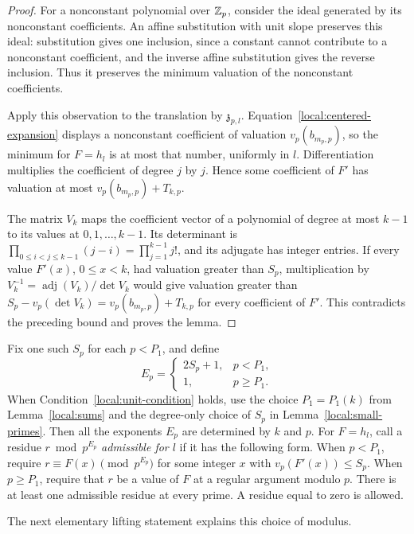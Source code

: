 \begin{proof}
For a nonconstant polynomial over \(\mathbb Z_p\), consider the ideal generated
by its nonconstant coefficients. An affine substitution with unit slope
preserves this ideal: substitution gives one inclusion, since a constant
cannot contribute to a nonconstant coefficient, and the inverse affine
substitution gives the reverse inclusion. Thus it preserves the minimum
valuation of the nonconstant coefficients.

Apply this observation to the translation by \(\mathfrak z_{p,l}\).
Equation~\eqref{local:centered-expansion} displays a nonconstant coefficient
of valuation \(v_p(b_{m_p,p})\), so the minimum for \(F=h_l\) is at most
that number, uniformly in \(l\). Differentiation multiplies the coefficient
of degree \(j\) by \(j\). Hence some coefficient of \(F'\) has valuation at
most \(v_p(b_{m_p,p})+T_{k,p}\).

The matrix \(V_k\) maps the coefficient vector of a polynomial of degree at
most \(k-1\) to its values at \(0,1,\ldots,k-1\). Its determinant is
\(\prod_{0\le i<j\le k-1}(j-i)=\prod_{j=1}^{k-1}j!\), and its adjugate has
integer entries. If every value \(F'(x)\), \(0\le x<k\), had valuation
greater than \(S_p\), multiplication by \(V_k^{-1}=\operatorname{adj}(V_k)/
\det V_k\) would give valuation greater than
\(S_p-v_p(\det V_k)=v_p(b_{m_p,p})+T_{k,p}\) for every coefficient of
\(F'\). This contradicts the preceding bound and proves the lemma.
\end{proof}

Fix one such \(S_p\) for each \(p<P_1\), and define
\[
 E_p=
 \begin{cases}
  2S_p+1,&p<P_1,\\
  1,&p\ge P_1.
 \end{cases}
\]
When Condition~\eqref{local:unit-condition} holds, use the choice
\(P_1=P_1(k)\) from Lemma~\ref{local:sums} and the degree-only choice of
\(S_p\) in Lemma~\ref{local:small-primes}. Then all the exponents \(E_p\)
are determined by \(k\) and \(p\).
For \(F=h_l\), call a residue \(r\bmod p^{E_p}\) \emph{admissible for
\(l\)} if it has the following form. When \(p<P_1\), require
\(r\equiv F(x)\pmod{p^{E_p}}\) for some integer \(x\) with
\(v_p(F'(x))\le S_p\). When \(p\ge P_1\), require that \(r\) be a value
of \(F\) at a regular argument modulo \(p\). There is at least one
admissible residue at every prime. A residue equal to zero is allowed.

The next elementary lifting statement explains this choice of modulus.

